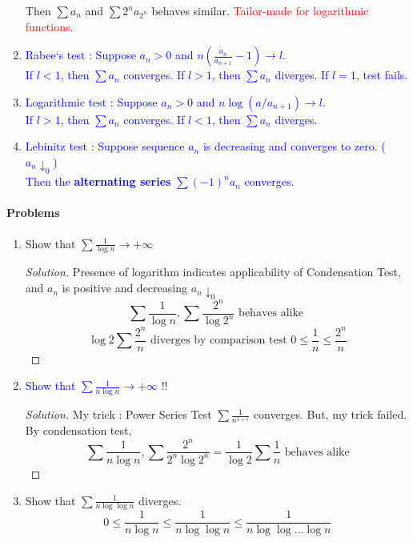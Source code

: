 \begin{enumerate}
{		Then $\sum a_n$ and $\sum 2^na_{2^n}$ behaves similar. \textcolor{red}{Tailor-made for logarithmic functions.}}
	\item \textcolor{blue}{Rabee`s test : Suppose $a_n > 0$ and $n\left(\frac{a_n}{a_{n+1}} -1 \right) \to l$.\\
		If $l < 1$, then $\sum a_n$ converges. If $l > 1$, then $\sum a_n$ diverges. If $l = 1$, test fails.}
	\item \textcolor{blue}{Logarithmic test : Suppose $a_n > 0$ and $n\log (a/a_{n+1}) \to l$.\\
		If $l > 1$, then $\sum a_n$ converges. If $l <1$, then $\sum a_n$ diverges.}
	\item \textcolor{blue}{Lebinitz test : Suppose sequence $a_n$ is decreasing and converges to zero. ($a_n \downarrow_0$)\\
		Then the \textbf{alternating series} $\sum (-1)^n a_n$ converges.}
\end{enumerate}

\paragraph{Problems}
\begin{enumerate}
	\item Show that $\sum \frac{1}{\log n} \to +\infty$ 
	\begin{proof}[Solution]
		Presence of logarithm indicates applicability of Condensation Test, and $a_n$ is positive and decreasing $a_n \downarrow_0$
		$$ \sum \frac{1}{\log n}, \sum \frac{2^n}{\log 2^n} \text{ behaves alike } $$
		$$ \log 2 \sum \frac{2^n}{n} \text{ diverges by comparison test } 0 \le \frac{1}{n} \le \frac{2^n}{n} $$
	\end{proof}
	\item \textcolor{blue}{Show that $\sum \frac{1}{n\log n} \to +\infty$ !!}
	\begin{proof}[Solution]
		My trick : Power Series Test $\sum \frac{1}{n^{1+\epsilon}}$ converges. But, my trick failed.\\
		By condensation test,
		$$ \sum \frac{1}{n\log n}, \sum \frac{2^n}{2^n \log 2^n} = \frac{1}{\log 2} \sum \frac{1}{n} \text{ behaves alike} $$
	\end{proof}
	\item Show that $\sum \frac{1}{n \log \log n}$ diverges.
		$$ 0 \le \frac{1}{n \log n} \le \frac{1}{n \log \log n} \le \frac{1}{n \log \log \dots \log n} $$
\end{enumerate}
